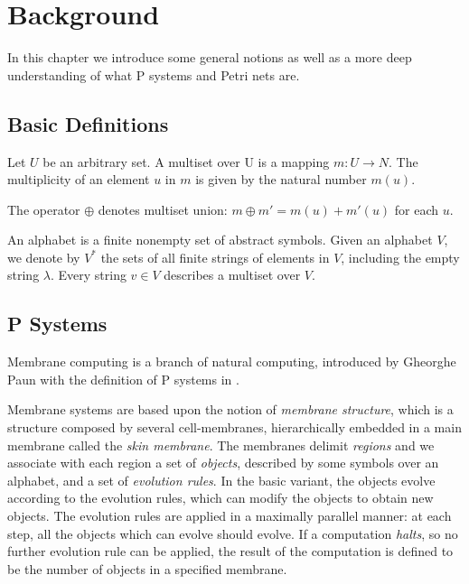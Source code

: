 \chapter{Background}

In this chapter we introduce some general notions as well as a more deep understanding of what P systems and Petri nets are.

\section{Basic Definitions}

\begin{definition}[Multiset]
Let $U$ be an arbitrary set. A multiset over U is a mapping \newline $m : U \rightarrow N$.
The multiplicity of an element $u$ in $m$ is given by the natural number $m(u)$.
\end{definition}

The operator $\oplus$ denotes multiset union: $m \oplus m' = m(u) + m'(u)$ for each $u$.

\begin{definition}[Alphabet]
An alphabet is a finite nonempty set of abstract symbols. Given an alphabet $V$, we denote by $V^*$
the sets of all finite strings of elements in $V$, including the empty string $\lambda$.
Every string $v \in V$ describes a multiset over $V$.
\end{definition}

\section{P Systems}

Membrane computing is a branch of natural computing, introduced by Gheorghe Paun with the definition of P systems in \cite{puaun2000computing,puaun2002membrane,paun1999computing}.

Membrane systems are based upon the notion of \textit{membrane structure}, which is a structure composed by several cell-membranes, hierarchically embedded in a main membrane called the \textit{skin membrane}.
The membranes delimit \textit{regions} and we associate with each region a set of \textit{objects}, described by some symbols over an alphabet, and a set of \textit{evolution rules}.
In the basic variant, the objects evolve according to the evolution rules, which can modify the objects to obtain new objects.
The evolution rules are applied in a maximally parallel manner: at each step, all the objects which can evolve should evolve.
If a computation \textit{halts}, so no further evolution rule can be applied, the result of the computation is defined to be the number of objects in a specified membrane.

